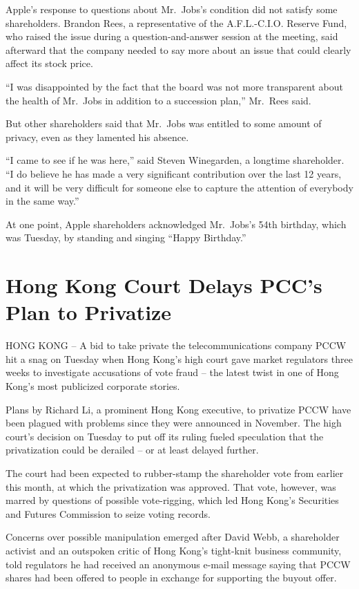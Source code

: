 \documentclass[12pt,a4paper,onecolumn]{article}
\begin{document}
\begin{CJK*}{GBK}{song}
Apple's response to questions about Mr.~Jobs's condition did not satisfy some shareholders. Brandon
Rees, a representative of the A.F.L.-C.I.O. Reserve Fund, who raised the issue during a
question-and-answer session at the meeting, said afterward that the company needed to say more about
an issue that could clearly affect its stock price.

``I was disappointed by the fact that the board was not more transparent about the health of
Mr.~Jobs in addition to a succession plan,'' Mr.~Rees said.

But other shareholders said that Mr.~Jobs was entitled to some amount of privacy, even as they
lamented his absence.

``I came to see if he was here,'' said Steven Winegarden, a longtime shareholder. ``I do believe he
has made a very significant contribution over the last 12 years, and it will be very difficult for
someone else to capture the attention of everybody in the same way.''

At one point, Apple shareholders acknowledged Mr.~Jobs's 54th birthday, which was Tuesday, by
standing and singing ``Happy Birthday.''

\section{Hong Kong Court Delays PCC's Plan to Privatize}

HONG KONG -- A bid to take private the telecommunications company PCCW hit a snag on Tuesday when
Hong Kong's high court gave market regulators three weeks to investigate accusations of vote fraud
-- the latest twist in one of Hong Kong's most publicized corporate stories.

Plans by Richard Li, a prominent Hong Kong executive, to privatize PCCW have been plagued with
problems since they were announced in November. The high court's decision on Tuesday to put off its
ruling fueled speculation that the privatization could be derailed -- or at least delayed further.

The court had been expected to rubber-stamp the shareholder vote from earlier this month, at which
the privatization was approved. That vote, however, was marred by questions of possible
vote-rigging, which led Hong Kong's Securities and Futures Commission to seize voting records.

Concerns over possible manipulation emerged after David Webb, a shareholder activist and an
outspoken critic of Hong Kong's tight-knit business community, told regulators he had received an
anonymous e-mail message saying that PCCW shares had been offered to people in exchange for
supporting the buyout offer.


\end{CJK*}
\end{document}
